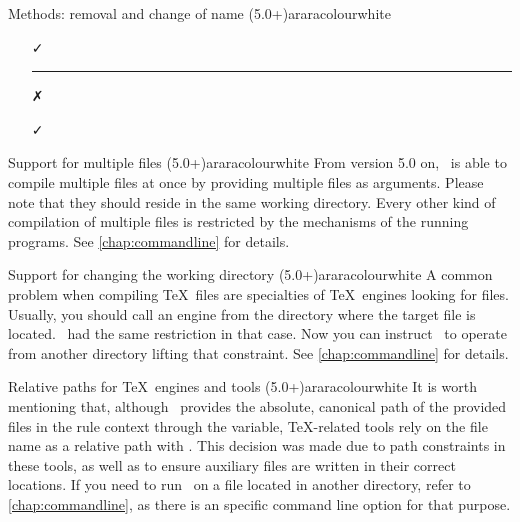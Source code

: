 \begin{messagebox}{Methods: removal and change of name (5.0+)}{araracolour}{\icinfo}{white}
\begin{itemize}
\item[\textcolor{okcolour}{\faCheck}] 

\vspace{1em}

{\color{araracolour}\hrule}

\item[\textcolor{warningcolour}{\faClose}] 

\vspace{.5em}

\hspace{2cm}\textcolor{teal}{\faArrowDown}

\item[\textcolor{okcolour}{\faCheck}]
\end{itemize}
\end{messagebox}

\begin{messagebox}{Support for multiple files (5.0+)}{araracolour}{\icinfo}{white}
From version 5.0 on, \arara\ is able to compile multiple files at once by providing multiple files as arguments. Please note that they should reside in the same working directory. Every other kind of compilation of multiple files is restricted by the mechanisms of the running programs. See \autoref{chap:commandline} for details.
\end{messagebox}

\begin{messagebox}{Support for changing the working directory (5.0+)}{araracolour}{\icinfo}{white}
A common problem when compiling \TeX\ files are specialties of \TeX\ engines looking for files. Usually, you should call an engine from the directory where the target file is located. \arara\ had the same restriction in that case. Now you can instruct \arara\ to operate from another directory lifting that constraint. See \autoref{chap:commandline} for details.
\end{messagebox}

\begin{messagebox}{Relative paths for \TeX\ engines and tools (5.0+)}{araracolour}{\icinfo}{white}
It is worth mentioning that, although \arara\ provides the absolute, canonical path of the provided files in the rule context through the  variable, \TeX-related tools rely on the file name as a relative path with . This decision was made due to path constraints in these tools, as well as to ensure auxiliary files are written in their correct locations. If you need to run \arara\ on a file located in another directory, refer to \autoref{chap:commandline}, as there is an specific command line option for that purpose.
\end{messagebox}

